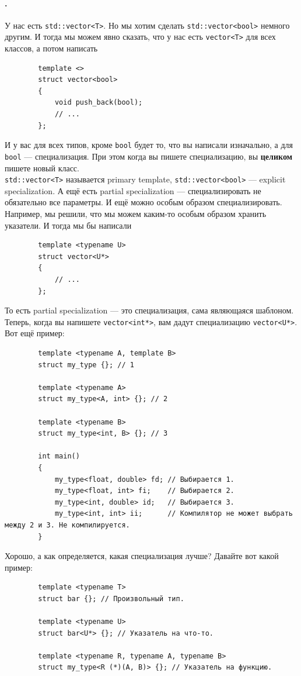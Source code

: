 \documentclass{article}
\begin{document}
    \paragraph{.}
    У нас есть \texttt{std::vector<T>}. Но мы хотим сделать \texttt{std::vector<bool>} немного другим. И тогда мы можем явно сказать, что у нас есть \texttt{vector<T>} для всех классов, а потом написать 
    \begin{verbatim}
        template <>
        struct vector<bool>
        {
            void push_back(bool);
            // ...
        };
    \end{verbatim}
    И у вас для всех типов, кроме \texttt{bool} будет то, что вы написали изначально, а для \texttt{bool} --- специализация. При этом когда вы пишете специализацию, вы \textbf{целиком} пишете новый класс.\\
    \texttt{std::vector<T>} называется primary template, \texttt{std::vector<bool>} --- explicit specialization. А ещё есть partial specialization --- специализировать не обязательно все параметры. И ещё можно особым образом специализировать. Например, мы решили, что мы можем каким-то особым образом хранить указатели. И тогда мы бы написали
    \begin{verbatim}
        template <typename U>
        struct vector<U*>
        {
            // ...
        };
    \end{verbatim}
    То есть partial specialization --- это специализация, сама являющаяся шаблоном. Теперь, когда вы напишете \texttt{vector<int*>}, вам дадут специализацию \texttt{vector<U*>}. Вот ещё пример:
    \begin{verbatim}
        template <typename A, template B>
        struct my_type {}; // 1

        template <typename A>
        struct my_type<A, int> {}; // 2

        template <typename B>
        struct my_type<int, B> {}; // 3

        int main()
        {
            my_type<float, double> fd; // Выбирается 1.
            my_type<float, int> fi;    // Выбирается 2.
            my_type<int, double> id;   // Выбирается 3.
            my_type<int, int> ii;      // Компилятор не может выбрать между 2 и 3. Не компилируется.
        }
    \end{verbatim}
    Хорошо, а как определяется, какая специализация лучше? Давайте вот какой пример:
    \begin{verbatim}
        template <typename T>
        struct bar {}; // Произвольный тип.
        
        template <typename U>
        struct bar<U*> {}; // Указатель на что-то.
        
        template <typename R, typename A, typename B>
        struct my_type<R (*)(A, B)> {}; // Указатель на функцию.
    \end{verbatim}
\end{document}
